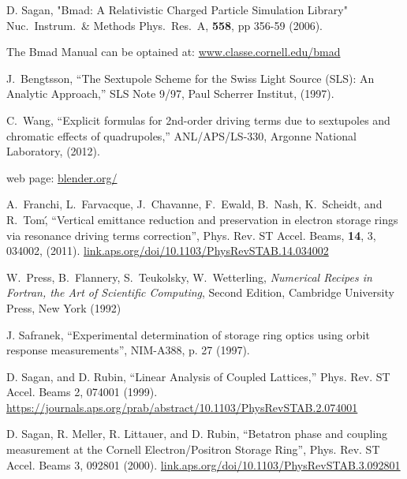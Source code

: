 \begin{thebibliography}{99}

D. Sagan,
"Bmad: A Relativistic Charged Particle Simulation Library"
Nuc.\ Instrum.\ \& Methods Phys.\ Res.\ A, {\bf 558}, pp 356-59 (2006).

The Bmad Manual can be optained at:
\hfill\break
\hspace*{20pt} 
\url{www.classe.cornell.edu/bmad}

J.~Bengtsson,
``The Sextupole Scheme for the Swiss Light Source (SLS): An Analytic Approach,''
SLS Note 9/97, Paul Scherrer Institut, (1997).

C.~Wang,
``Explicit formulas for 2nd-order driving terms due to sextupoles and
chromatic effects of quadrupoles,''
ANL/APS/LS-330, Argonne National Laboratory, (2012).

 web page:
\hfill\break
\hspace*{20pt} 
\url{blender.org/}

A.~Franchi, L.~Farvacque, J.~Chavanne, F.~Ewald, B.~Nash, K.~Scheidt, and R.~Tom\',
``Vertical emittance reduction and preservation in electron storage rings via resonance driving terms correction'',
Phys. Rev. ST Accel. Beams,
{\bf 14}, 3, 034002, (2011). 
\hfill\break
\hspace*{20pt}
\url{link.aps.org/doi/10.1103/PhysRevSTAB.14.034002}

W.~Press, B.~Flannery, S.~Teukolsky, W.~Wetterling,
{\em Numerical Recipes in Fortran, the Art of Scientific Computing},
Second Edition, Cambridge University Press, New York (1992)

J. Safranek, ``Experimental determination of storage ring optics
using orbit response measurements'', NIM-A388, p. 27 (1997).

D. Sagan, and D. Rubin,
``Linear Analysis of Coupled Lattices,''
Phys. Rev. ST Accel. Beams 2, 074001 (1999).
\hfill\break
\hspace*{20pt}
\url{https://journals.aps.org/prab/abstract/10.1103/PhysRevSTAB.2.074001}

D. Sagan, R. Meller, R. Littauer, and D. Rubin,
``Betatron phase and coupling measurement at the Cornell Electron/Positron Storage Ring'', 
Phys. Rev. ST Accel. Beams 3, 092801 (2000).
\hfill\break
\hspace*{20pt}
\url{link.aps.org/doi/10.1103/PhysRevSTAB.3.092801}


\end{thebibliography}
